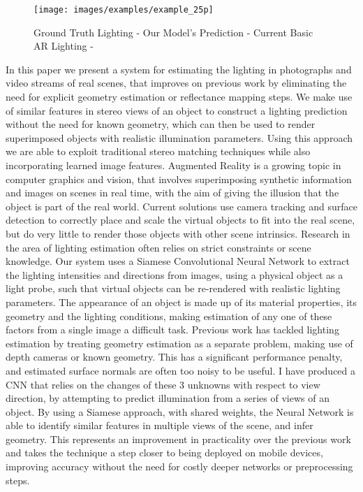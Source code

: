 \documentclass[ %
                    author={Gavin Parker},
                supervisor={Dr. Neill Campbell},
                    degree={MEng},
                     title={Deep Siamese Networks for Illumination Estimation from Stereo Images},
                  subtitle={},
                      type={research},
                      year={2018} ]{dissertation}
\begin{document}
\begin{figure}[H]
\centering
\texttt{[image: images/examples/example\_25p]}\\

\caption{Ground Truth Lighting - Our Model's Prediction - Current Basic AR Lighting - }
\label{example_1}
\end{figure}
\noindent
In this paper we present a system for estimating the lighting in photographs and video streams of real scenes, that improves on previous work by eliminating the need for explicit geometry estimation or reflectance mapping steps. We make use of similar features in stereo views of an object to construct a lighting prediction without the need for known geometry, which can then be used to render superimposed objects with realistic illumination parameters. Using this approach we are able to exploit traditional stereo matching techniques while also incorporating learned image features.
\newline
Augmented Reality is a growing topic in computer graphics and vision, that involves superimposing synthetic information and images on scenes in real time, with the aim of giving the illusion that the object is part of the real world. Current solutions use camera tracking and surface detection to correctly place and scale the virtual objects to fit into the real scene, but do very little to render those objects with other scene intrinsics. Research in the area of lighting estimation often relies on strict constraints or scene knowledge. Our system uses a Siamese Convolutional Neural Network to extract the lighting intensities and directions from images, using a physical object as a light probe, such that virtual objects can be re-rendered with realistic lighting parameters.
\newline
The appearance of an object is made up of its material properties, its geometry and the lighting conditions, making estimation of any one of these factors from a single image a difficult task. Previous work has tackled lighting estimation by treating geometry estimation as a separate problem, making use of depth cameras or known geometry. This has a significant performance penalty, and estimated surface normals are often too noisy to be useful. I have produced a CNN that relies on the changes of these 3 unknowns with respect to view direction, by attempting to predict illumination from a series of views of an object. By using a Siamese approach, with shared weights, the Neural Network is able to identify similar features in multiple views of the scene, and infer geometry. This represents an improvement in practicality over the previous work and takes the technique a step closer to being deployed on mobile devices, improving accuracy without the need for costly deeper networks or preprocessing steps.
\end{document}
